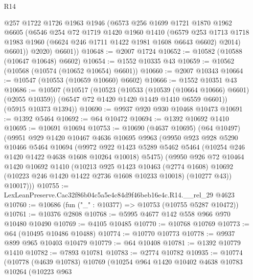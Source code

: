 \begin{lexlean}{R14}
\begin{coremodule}
          @257
          @1722
          @1726
          @1963
          @1946
          (@6573
            @256
            @1699
            @1721
            @1870
            @1962
            @6605
            (@6546
              @254
              @72
              @1719
              @1420
              @1960
              @1410
              (@6579
                @253
                @1713
                @1718
                @1983
                @1960
                (@6624 @246 @1711 @1422 @1981 @1608 @6643 @6602)
                @2014)
              @6601))
          @2020)
        @6601))
@10648 := @2007 @1724
@10652 := @10582 (@10588 (@10647 @10648) @6602)
@10654 := @1552 @10335 @43
@10659 := @10562 (@10568 (@10574 (@10652 @10654) @6601))
@10660 := @2007 @10343
@10664 := @10547 (@10553 (@10659 @10660) @6602)
@10666 := @1552 @10351 @43
@10686 := @10507
    (@10517
      (@10523
        (@10533 (@10539 (@10664 @10666) @6601) (@2055 @10359))
        (@6547 @72 @1420 @1420 @1449 @1410 @6559 @6601))
      (@5915 @10373 @1394))
@10690 := @9937 @920 @930 @10468 @10473
@10691 := @1392 @5464
@10692 := @64 @10472
@10694 := @1392 @10692 @1410
@10695 := @10691 @10694
@10753 := @10690
    (@4637 @10695)
    (@64 @10497)
    (@9951
      @929
      @1420
      @10467
      @4636
      @10695
      @9963
      (@9950
        @923
        @928
        @5290
        @10466
        @5464
        @10694
        (@9972
          @922
          @1423
          @5289
          @5462
          @5464
          (@10254 @246 @1420 @1422 @4638 @1608 @10264 @10018)
          @5475)
        (@9950
          @926
          @72
          @10464
          @1420
          @10692
          @1410
          (@10213
            @925
            @1423
            @10463
            (@2774 @1608)
            @10692
            (@10223 @246 @1420 @1422 @2736 @1608 @10233 @10018)
            (@10277 @43))
          @10017)))
@10755 := LexLeanPreserve.Cac32f86b04c5a5e4c84d9f46beb16e4c.R14.__rel_29 @4623
@10760 := @10686 (fun ("_" : @10377) => @10753 (@10755 @5287 @10472))
@10761 := @10376 @2808
@10768 := @5995 @4677 @142 @558 @966 @970 @10480 @10490
@10769 := @4105 @10485
@10770 := @10768 @10769
@10773 := @64 (@10495 @10486 @10488)
@10774 := @10770 @10773
@10778 := @9937 @899 @965 @10403 @10479
@10779 := @64 @10408
@10781 := @1392 @10779 @1410
@10782 := @7893 @10781
@10783 := @2774 @10782
@10935 := @10774
    (@10778
      (@4639 @10783)
      @10769
      (@10254
        @964
        @1420
        @10402
        @4638
        @10783
        @10264
        (@10223
          @963

\end{coremodule}
\end{lexlean}
